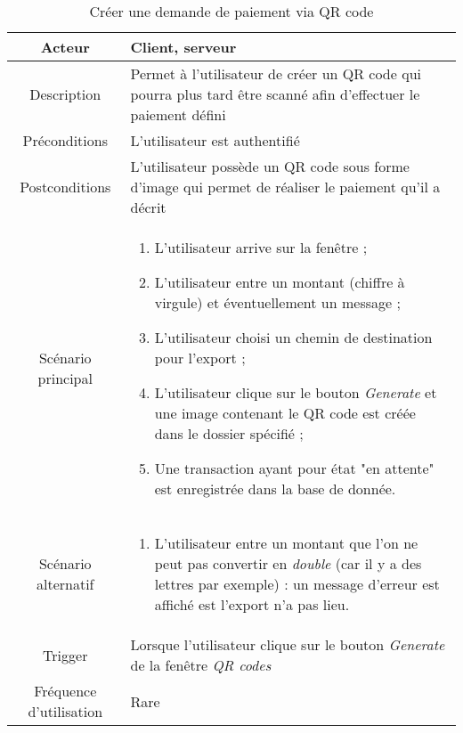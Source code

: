 \documentclass{article}
\begin{document}
\begin{table}

\begin{tabular}{|c|p{11cm}|}
\hline
Acteur & Client, serveur \\
\hline
Description & Permet à l'utilisateur de créer un QR code qui pourra plus tard être scanné afin d'effectuer le paiement défini \\
\hline
Préconditions & L'utilisateur est authentifié \\
\hline
Postconditions & L'utilisateur possède un QR code sous forme d'image qui permet de réaliser le paiement qu'il a décrit \\
\hline
Scénario principal & \begin{enumerate}
\item L'utilisateur arrive sur la fenêtre ;
\item L'utilisateur entre un montant (chiffre à virgule) et éventuellement un message ;
\item L'utilisateur choisi un chemin de destination pour l'export ;
\item L'utilisateur clique sur le bouton \emph{Generate} et une image contenant le QR code est créée dans le dossier spécifié ;
\item Une transaction ayant pour état "en attente" est enregistrée dans la base de donnée.
\end{enumerate} \\
\hline
Scénario alternatif & \begin{enumerate}
\item L'utilisateur entre un montant que l'on ne peut pas convertir en \emph{double} (car il y a des lettres par exemple) : un message d'erreur est affiché est l'export n'a pas lieu.
\end{enumerate} \\
\hline
Trigger & Lorsque l'utilisateur clique sur le bouton \emph{Generate} de la fenêtre \emph{QR codes} \\
\hline
Fréquence d'utilisation & Rare \\
\hline
\end{tabular}

\caption{Créer une demande de paiement via QR code}

\end{table}
\end{document}
